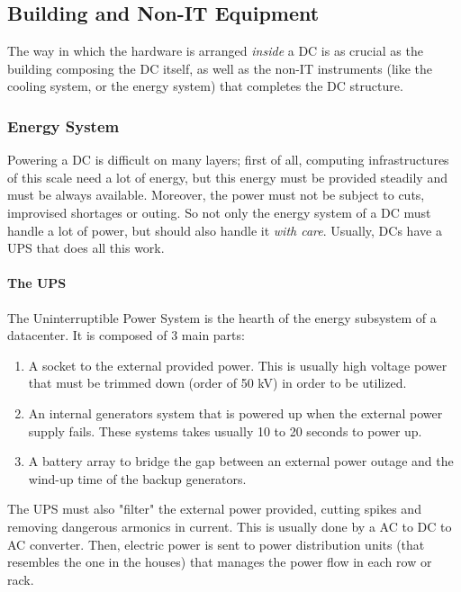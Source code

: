 \documentclass[10pt,a4paper]{article}
\begin{document}
			\subsection{Building and Non-IT Equipment}
				The way in which the hardware is arranged \emph{inside} a DC is as crucial as the building composing the DC itself, as well as the non-IT instruments (like the cooling system, or the energy system) that completes the DC structure.\\
				
				\subsubsection{Energy System}
					Powering a DC is difficult on many layers; first of all, computing infrastructures of this scale need a lot of energy, but this energy must be provided steadily and must be always available. Moreover, the power must not be subject to cuts, improvised shortages or outing. So not only the energy system of a DC must handle a lot of power, but should also handle it \emph{with care}. Usually, DCs have a UPS that does all this work.
					
					\paragraph{The UPS}
						The Uninterruptible Power System is the hearth of the energy subsystem of a datacenter. It is composed of 3 main parts:
						\begin{enumerate}
							\item A socket to the external provided power. This is usually high voltage power that must be trimmed down (order of 50 kV) in order to be utilized.
							\item An internal generators system that is powered up when the external power supply fails. These systems takes usually 10 to 20 seconds to power up.
							\item A battery array to bridge the gap between an external power outage and the wind-up time of the backup generators.
						\end{enumerate}
						The UPS must also "filter" the external power provided, cutting spikes and removing dangerous armonics in current. This is usually done by a AC to DC to AC converter. Then, electric power is sent to power distribution units (that resembles the one in the houses) that manages the power flow in each row or rack.
				
\end{document}
